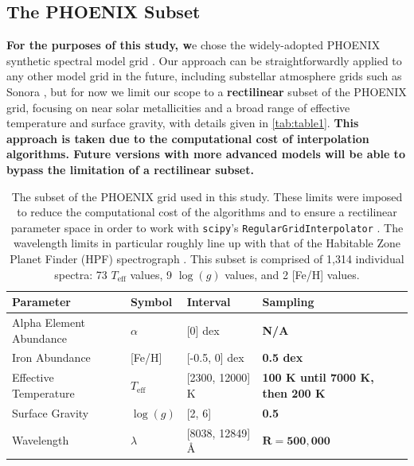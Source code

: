\documentclass[twocolumn, linenumbers]{aastex631}
\begin{document}
\subsection{The PHOENIX Subset}
\textbf{For the purposes of this study, w}e chose the widely-adopted PHOENIX synthetic spectral model grid \citep{PHOENIX}.
Our approach can be straightforwardly applied to any other model grid in the future, including substellar atmosphere grids such as Sonora \citep{bobcat, cholla, diamondback, elfowl}, but for now we limit our scope to a \textbf{rectilinear} subset of the PHOENIX grid, focusing on near solar metallicities and a broad range of effective temperature and surface gravity, with details given in \autoref{tab:table1}.
\textbf{This approach is taken due to the computational cost of interpolation algorithms.
Future versions with more advanced models will be able to bypass the limitation of a rectilinear subset.}

\begin{table}
    \hspace*{0.6cm}\begin{tabular}{llll}
        \hline
        \bf{Parameter} & \bf{Symbol} & \bf{Interval} & \bf{Sampling}\\
        \hline
        Alpha Element Abundance & $\alpha$ & [0] dex & \bf{N/A}\\
        Iron Abundance & [Fe/H] & [-0.5, 0] dex & \bf{0.5 dex}\\
        Effective Temperature & $T_{\mathrm{eff}}$ & [2300, 12000] K & \bf{100 K until 7000 K, then 200 K}\\
        Surface Gravity & $\log(g)$ & [2, 6] & \bf{0.5} \\
        Wavelength & $\lambda$ & [8038, 12849] \AA & $\mathbf{R = 500,000}$\\
        \hline
    \end{tabular}
    \caption{The subset of the PHOENIX grid used in this study.
    These limits were imposed to reduce the computational cost of the algorithms and to ensure a rectilinear parameter space in order to work with \texttt{scipy}'s \texttt{RegularGridInterpolator} \citep{scipy}.
    The wavelength limits in particular roughly line up with that of the Habitable Zone Planet Finder (HPF) spectrograph \citep{HPF}.
    This subset is comprised of 1,314 individual spectra: 73 $T_{\mathrm{eff}}$ values, 9 $\log(g)$ values, and 2 [Fe/H] values.}
    \label{tab:table1}
\end{table}
\end{document}
